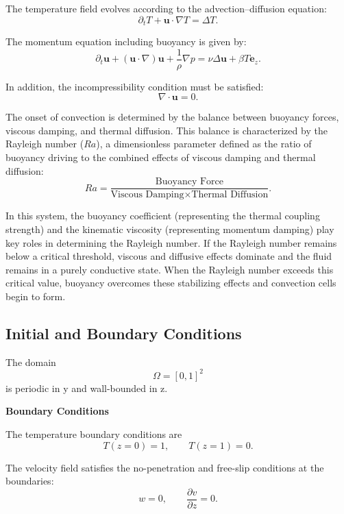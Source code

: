 The temperature field evolves according to the advection--diffusion equation:
\begin{equation}
\partial_t T + \mathbf{u} \cdot \nabla T = \Delta T .
\end{equation}

The momentum equation including buoyancy is given by:
\begin{equation}
\partial_t \mathbf{u} + (\mathbf{u} \cdot \nabla)\mathbf{u} + \frac{1}{\rho}\nabla p
= \nu \Delta \mathbf{u} + \beta T \mathbf{e}_z .
\end{equation}

In addition, the incompressibility condition must be satisfied:
\begin{equation}
\nabla \cdot \mathbf{u} = 0 .
\end{equation}

The onset of convection is determined by the balance between buoyancy forces, viscous damping, and thermal diffusion. This balance is characterized by the Rayleigh number ($Ra$), a dimensionless parameter defined as the ratio of buoyancy driving to the combined effects of viscous damping and thermal diffusion:
\begin{equation}
Ra = \frac{\text{Buoyancy Force}}{\text{Viscous Damping} \times \text{Thermal Diffusion}} .
\end{equation}

In this system, the buoyancy coefficient (representing the thermal coupling strength) and the kinematic viscosity (representing momentum damping) play key roles in determining the Rayleigh number. If the Rayleigh number remains below a critical threshold, viscous and diffusive effects dominate and the fluid remains in a purely conductive state. When the Rayleigh number exceeds this critical value, buoyancy overcomes these stabilizing effects and convection cells begin to form.

\subsection{Initial and Boundary Conditions}
The domain \[\Omega = [0,1]^2\] is periodic in y and wall-bounded in z.

\textbf{Boundary Conditions}

The temperature boundary conditions are
\begin{equation}
T(z=0) = 1, \qquad T(z=1) = 0 .
\end{equation}

The velocity field satisfies the no-penetration and free-slip conditions at the boundaries:
\begin{equation}
w = 0, \qquad \frac{\partial v}{\partial z} = 0 .
\end{equation}

